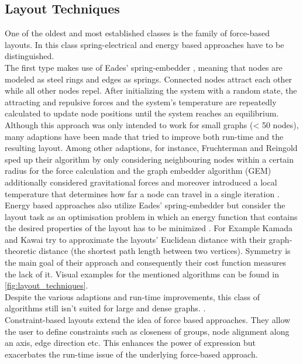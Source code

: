 \subsection{Layout Techniques}
One of the oldest and most established classes is the family of force-based layouts. In this class spring-electrical and energy based approaches have to be distinguished.\\ 
The first type makes use of Eades' spring-embedder \cite{Gibson2013}, meaning that nodes are modeled as steel rings and edges as springs. Connected nodes attract each other while all other nodes repel. After initializing the system with a random state, the attracting and repulsive forces and the system's temperature are repeatedly calculated to update node positions until the system reaches an equilibrium. Although this approach was only intended to work for small graphs (< 50 nodes), many adaptions have been made that tried to improve both run-time and the resulting layout. Among other adaptions, for instance, Fruchterman and Reingold\cite{Fruchterman1991} sped up their algorithm by only considering neighbouring nodes within a certain radius for the force calculation and the graph embedder algorithm (GEM) \cite{Frick1995} additionally considered gravitational forces and moreover introduced a local temperature that determines how far a node can travel in a single iteration \cite{Gibson2013}.\\
Energy based approaches also utilize Eades' spring-embedder but consider the layout task as an optimisation problem in which an energy function that contains the desired properties of the layout has to be minimized \cite{Gibson2013}. For Example Kamada and Kawai \cite{Kamada1989} try to approximate the layouts' Euclidean distance with their graph-theoretic distance (the shortest path length between two vertices). Symmetry is the main goal of their approach and consequently their cost function measures the lack of it.
Visual examples for the mentioned algorithms can be found in \autoref{fig:layout_techniques}.\\
Despite the various adaptions and run-time improvements, this class of algorithms still isn't suited for large and dense graphs.\cite{Gibson2013} \cite{VonLandesberger2011}.
\\
Constraint-based layouts extend the idea of force based approaches. They allow the user to define constraints such as closeness of groups, node alignment along an axis, edge direction etc. This enhances the power of expression but exacerbates the run-time issue of the underlying force-based approach\cite{VonLandesberger2011}.


